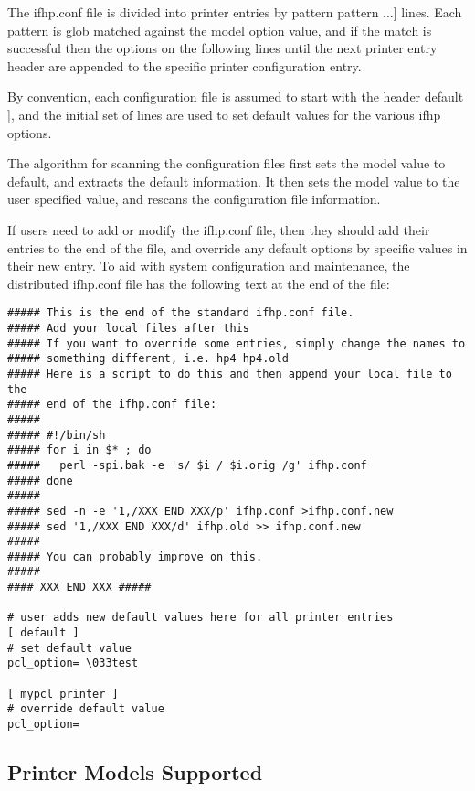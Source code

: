 \documentclass[a4paper]{article}
\begin{document}
The {\ttfamily ifhp.conf} file is divided into printer entries by {\ttfamily {[} pattern pattern ...{]}}
lines.
Each pattern is glob matched against the {\ttfamily model} option value,
and if the match is successful then the options on the following lines
until the next
printer entry header
are appended to the specific printer configuration entry.

By convention,
each configuration file is assumed to start with the header
{\ttfamily {[} default {]}},
and the initial set of lines are used to
set default values for the various {\ttfamily ifhp} options.

The algorithm for scanning the configuration files first
sets the {\ttfamily model} value to {\ttfamily default},
and extracts the default information.
It then sets the {\ttfamily model} value to the user specified value,
and rescans the configuration file information.

If users need to add or modify the {\ttfamily ifhp.conf} file,
then they should add their entries to the end of the file,
and override any default options by specific values in their new entry.
To aid with system configuration and maintenance,
the distributed {\ttfamily ifhp.conf} file has the following text at the end of the file:
\begin{tscreen}
\begin{verbatim}
##### This is the end of the standard ifhp.conf file.
##### Add your local files after this
##### If you want to override some entries, simply change the names to
##### something different, i.e. hp4 hp4.old
##### Here is a script to do this and then append your local file to the
##### end of the ifhp.conf file:
#####
##### #!/bin/sh
##### for i in $* ; do
#####   perl -spi.bak -e 's/ $i / $i.orig /g' ifhp.conf
##### done
#####
##### sed -n -e '1,/XXX END XXX/p' ifhp.conf >ifhp.conf.new
##### sed '1,/XXX END XXX/d' ifhp.old >> ifhp.conf.new
#####
##### You can probably improve on this.
#####
#### XXX END XXX #####

# user adds new default values here for all printer entries
[ default ]
# set default value
pcl_option= \033test

[ mypcl_printer ]
# override default value
pcl_option=
\end{verbatim}
\end{tscreen}



\subsection{Printer Models Supported
\label{modelselection}}
\end{document}
